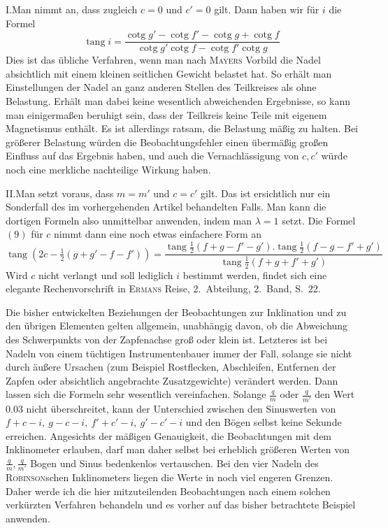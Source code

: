 I.\quad Man nimmt an, dass zugleich $c=0$ und $c'=0$ gilt. Dann haben wir für $i$ die Formel
\[
\operatorname{tang}i=\frac{\operatorname{cotg}g'-\operatorname{cotg}f'-\operatorname{cotg}g+\operatorname{cotg}f}{\operatorname{cotg}g'\operatorname{cotg}f-\operatorname{cotg}f'\operatorname{cotg}g}
\]
Dies ist das übliche Verfahren, wenn man nach \textsc{Mayers} Vorbild die Nadel absichtlich mit einem kleinen seitlichen Gewicht belastet hat. So erhält man Einstellungen der Nadel an ganz anderen Stellen des Teilkreises als ohne Belastung. Erhält man dabei keine wesentlich abweichenden Ergebnisse, so kann man einigermaßen beruhigt sein, dass der Teilkreis keine Teile mit eigenem Magnetismus enthält. Es ist allerdings ratsam, die Belastung mäßig zu halten. Bei größerer Belastung würden die Beobachtungsfehler einen übermäßig großen Einfluss auf das Ergebnis haben, und auch die Vernachlässigung von $c,c'$ würde noch eine merkliche nachteilige Wirkung haben.

II.\quad Man setzt voraus, dass $m=m'$ und $c=c'$ gilt. Das ist ersichtlich nur ein Sonderfall des im vorhergehenden Artikel behandelten Falls. Man kann die dortigen Formeln also unmittelbar anwenden, indem man $\lambda=1$ setzt. Die Formel $(9)$ für $c$ nimmt dann eine noch etwas einfachere Form an
\[
\operatorname{tang}(2c-\tfrac12(g+g'-f-f'))=\frac{\operatorname{tang}\frac12(f+g-f'-g').\operatorname{tang}\frac12(f-g-f'+g')}{\operatorname{tang}\frac12(f+g+f'+g')}
\]
Wird $c$ nicht verlangt und soll lediglich $i$ bestimmt werden, findet sich eine elegante Rechenvorschrift in \textsc{Ermans} Reise, 2.\ Abteilung, 2.\ Band, S.\ 22.

Die bisher entwickelten Beziehungen der Beobachtungen zur Inklination und zu den übrigen Elementen gelten allgemein, unabhängig davon, ob die Abweichung des Schwerpunkts von der Zapfenachse groß oder klein ist. Letzteres ist bei Nadeln von einem tüchtigen Instrumentenbauer immer der Fall, solange sie nicht durch äußere Ursachen (zum Beispiel Rostflecken, Abschleifen, Entfernen der Zapfen oder absichtlich angebrachte Zusatzgewichte) verändert werden. Dann lassen sich die Formeln sehr wesentlich vereinfachen. Solange $\frac{q}{m}$ oder $\frac{q}{m'}$ den Wert $0.03$ nicht überschreitet, kann der Unterschied zwischen den Sinuswerten von $f+c-i,\ g-c-i,\ f'+c'-i,\ g'-c'-i$ und den Bögen selbst keine Sekunde erreichen. Angesichts der mäßigen Genauigkeit, die Beobachtungen mit dem Inklinometer erlauben, darf man daher selbst bei erheblich größeren Werten von $\frac{q}{m},\frac{q}{m'}$ Bogen und Sinus bedenkenlos vertauschen. Bei den vier Nadeln des \textsc{Robinson}schen Inklinometers liegen die Werte in noch viel engeren Grenzen. Daher werde ich die hier mitzuteilenden Beobachtungen nach einem solchen verkürzten Verfahren behandeln und es vorher auf das bisher betrachtete Beispiel anwenden.

